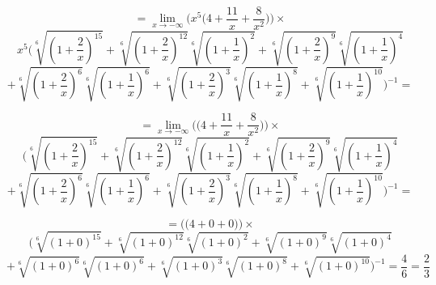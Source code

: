 \documentclass{article}
\begin{document}
\begin{equation*}
    = \lim_{x \to - \infty} \Bigg(x^{5} \Big(4 + \frac{11}{x} + \frac{8}{x^2}\Big)\Bigg) \times %
\end{equation*}
\begin{equation*}
    x^{5}\Bigg(\sqrt[6]{(1 + \frac{2}{x})^{15}} + \sqrt[6]{(1 + \frac{2}{x})^{12}}\sqrt[6]{(1 + \frac{1}{x})^{2}}  + \sqrt[6]{(1 + \frac{2}{x})^{9}}\sqrt[6]{(1 + \frac{1}{x})^{4}}
\end{equation*}
\begin{equation*}
    +  \sqrt[6]{(1 + \frac{2}{x})^{6}}\sqrt[6]{(1 + \frac{1}{x})^{6}} + \sqrt[6]{(1 + \frac{2}{x})^{3}}\sqrt[6]{(1 + \frac{1}{x})^{8}} + \sqrt[6]{(1 + \frac{1}{x})^{10}}\Bigg)^{-1} = 
\end{equation*}

\begin{equation*}
    = \lim_{x \to - \infty} \Bigg(\Big(4 + \frac{11}{x} + \frac{8}{x^2}\Big)\Bigg) \times %
\end{equation*}
\begin{equation*}
    \Bigg(\sqrt[6]{(1 + \frac{2}{x})^{15}} + \sqrt[6]{(1 + \frac{2}{x})^{12}}\sqrt[6]{(1 + \frac{1}{x})^{2}}  + \sqrt[6]{(1 + \frac{2}{x})^{9}}\sqrt[6]{(1 + \frac{1}{x})^{4}}
\end{equation*}
\begin{equation*}
    +  \sqrt[6]{(1 + \frac{2}{x})^{6}}\sqrt[6]{(1 + \frac{1}{x})^{6}} + \sqrt[6]{(1 + \frac{2}{x})^{3}}\sqrt[6]{(1 + \frac{1}{x})^{8}} + \sqrt[6]{(1 + \frac{1}{x})^{10}}\Bigg)^{-1} = 
\end{equation*}

\begin{equation*}
    = \Bigg(\Big(4 + 0 + 0\Big)\Bigg) \times %
\end{equation*}
\begin{equation*}
    \Bigg(\sqrt[6]{(1 + 0)^{15}} + \sqrt[6]{(1 + 0)^{12}}\sqrt[6]{(1 + 0)^{2}}  + \sqrt[6]{(1 + 0)^{9}}\sqrt[6]{(1 + 0)^{4}}
\end{equation*}
\begin{equation*}
    +  \sqrt[6]{(1 + 0)^{6}}\sqrt[6]{(1 + 0)^{6}} + \sqrt[6]{(1 + 0)^{3}}\sqrt[6]{(1 + 0)^{8}} + \sqrt[6]{(1 + 0)^{10}}\Bigg)^{-1} = \frac{4}{6} = \frac{2}{3}
\end{equation*}




\end{document}

